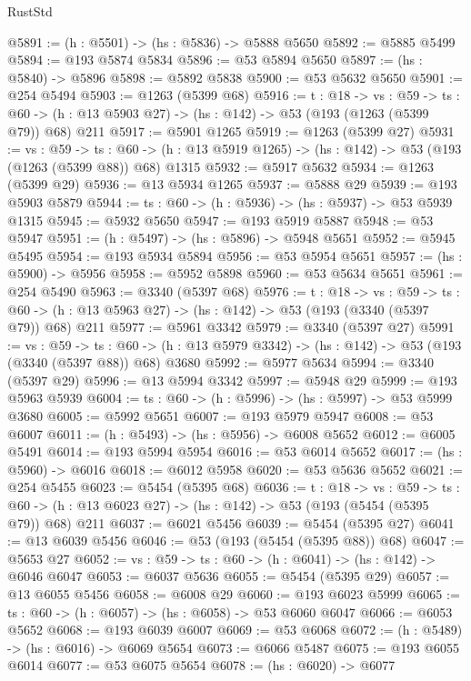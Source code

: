 \begin{lexlean}{RustStd}
\begin{coremodule}
@5891 := (h : @5501) -> (hs : @5836) -> @5888 @5650
@5892 := @5885 @5499
@5894 := @193 @5874 @5834
@5896 := @53 @5894 @5650
@5897 := (hs : @5840) -> @5896
@5898 := @5892 @5838
@5900 := @53 @5632 @5650
@5901 := @254 @5494
@5903 := @1263 (@5399 @68)
@5916 := {t : @18} ->
  {vs : @59} ->
  {ts : @60} -> (h : @13 @5903 @27) -> (hs : @142) -> @53 (@193 (@1263 (@5399 @79)) @68) @211
@5917 := @5901 @1265
@5919 := @1263 (@5399 @27)
@5931 := {vs : @59} ->
  {ts : @60} -> (h : @13 @5919 @1265) -> (hs : @142) -> @53 (@193 (@1263 (@5399 @88)) @68) @1315
@5932 := @5917 @5632
@5934 := @1263 (@5399 @29)
@5936 := @13 @5934 @1265
@5937 := @5888 @29
@5939 := @193 @5903 @5879
@5944 := {ts : @60} -> (h : @5936) -> (hs : @5937) -> @53 @5939 @1315
@5945 := @5932 @5650
@5947 := @193 @5919 @5887
@5948 := @53 @5947
@5951 := (h : @5497) -> (hs : @5896) -> @5948 @5651
@5952 := @5945 @5495
@5954 := @193 @5934 @5894
@5956 := @53 @5954 @5651
@5957 := (hs : @5900) -> @5956
@5958 := @5952 @5898
@5960 := @53 @5634 @5651
@5961 := @254 @5490
@5963 := @3340 (@5397 @68)
@5976 := {t : @18} ->
  {vs : @59} ->
  {ts : @60} -> (h : @13 @5963 @27) -> (hs : @142) -> @53 (@193 (@3340 (@5397 @79)) @68) @211
@5977 := @5961 @3342
@5979 := @3340 (@5397 @27)
@5991 := {vs : @59} ->
  {ts : @60} -> (h : @13 @5979 @3342) -> (hs : @142) -> @53 (@193 (@3340 (@5397 @88)) @68) @3680
@5992 := @5977 @5634
@5994 := @3340 (@5397 @29)
@5996 := @13 @5994 @3342
@5997 := @5948 @29
@5999 := @193 @5963 @5939
@6004 := {ts : @60} -> (h : @5996) -> (hs : @5997) -> @53 @5999 @3680
@6005 := @5992 @5651
@6007 := @193 @5979 @5947
@6008 := @53 @6007
@6011 := (h : @5493) -> (hs : @5956) -> @6008 @5652
@6012 := @6005 @5491
@6014 := @193 @5994 @5954
@6016 := @53 @6014 @5652
@6017 := (hs : @5960) -> @6016
@6018 := @6012 @5958
@6020 := @53 @5636 @5652
@6021 := @254 @5455
@6023 := @5454 (@5395 @68)
@6036 := {t : @18} ->
  {vs : @59} ->
  {ts : @60} -> (h : @13 @6023 @27) -> (hs : @142) -> @53 (@193 (@5454 (@5395 @79)) @68) @211
@6037 := @6021 @5456
@6039 := @5454 (@5395 @27)
@6041 := @13 @6039 @5456
@6046 := @53 (@193 (@5454 (@5395 @88)) @68)
@6047 := @5653 @27
@6052 := {vs : @59} -> {ts : @60} -> (h : @6041) -> (hs : @142) -> @6046 @6047
@6053 := @6037 @5636
@6055 := @5454 (@5395 @29)
@6057 := @13 @6055 @5456
@6058 := @6008 @29
@6060 := @193 @6023 @5999
@6065 := {ts : @60} -> (h : @6057) -> (hs : @6058) -> @53 @6060 @6047
@6066 := @6053 @5652
@6068 := @193 @6039 @6007
@6069 := @53 @6068
@6072 := (h : @5489) -> (hs : @6016) -> @6069 @5654
@6073 := @6066 @5487
@6075 := @193 @6055 @6014
@6077 := @53 @6075 @5654
@6078 := (hs : @6020) -> @6077

\end{coremodule}
\end{lexlean}
